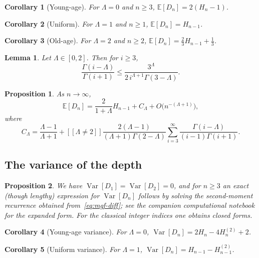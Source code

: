 \documentclass[11pt]{article}
\newtheorem{proposition}{Proposition}
\newtheorem{corollary}{Corollary}
\newtheorem{lemma}{Lemma}
\theoremstyle{remark}
\newcommand{\E}{\mathbb{E}}
\newcommand{\Var}{\operatorname{Var}}
\newcommand{\iverson}[1]{[\![#1]\!]}
\begin{document}
\begin{corollary}[Young-age]
For \(\Lambda=0\) and \(n\ge 3\), \(\E[D_n]=2(H_n-1)\).
\end{corollary}

\begin{corollary}[Uniform]
For \(\Lambda=1\) and \(n\ge 1\), \(\E[D_n]=H_{n-1}\).
\end{corollary}

\begin{corollary}[Old-age]
For \(\Lambda=2\) and \(n\ge 2\), \(\E[D_n]=\tfrac23 H_{n-1}+\tfrac13\).
\end{corollary}

\begin{lemma}
\label{lem:gamma-bound}
Let \(\Lambda\in[0,2]\). Then for \(i\ge 3\),
\[
\frac{\Gamma(i-\Lambda)}{\Gamma(i+1)}
\le\frac{3^\Lambda}{2\,i^{\Lambda+1}\Gamma(3-\Lambda)}.
\]
\end{lemma}

\begin{proposition}
\label{prop:asymp-mean}
As \(n\to\infty\),
\[
\E[D_n]=\frac{2}{1+\Lambda}H_{n-1}+C_\Lambda+O\bigl(n^{-(\Lambda+1)}\bigr),
\]
where
\[
C_\Lambda
=\frac{\Lambda-1}{\Lambda+1}
+\iverson{\Lambda\neq 2}
\frac{2(\Lambda-1)}{(\Lambda+1)\Gamma(2-\Lambda)}
\sum_{i=3}^\infty\frac{\Gamma(i-\Lambda)}{(i-1)\Gamma(i+1)}.
\]
\end{proposition}

\subsection{The variance of the depth}

\begin{proposition}
\label{prop:exact-var}
We have \(\Var[D_1]=\Var[D_2]=0\), and for \(n\ge 3\) an exact (though lengthy)
expression for \(\Var[D_n]\) follows by solving the second-moment recurrence
obtained from~\eqref{eq:mgf-diff}; see the companion computational notebook for
the expanded form. For the classical integer indices one obtains closed forms.
\end{proposition}

\begin{corollary}[Young-age variance]
For \(\Lambda=0\), \(\Var[D_n]=2H_n-4H_n^{(2)}+2\).
\end{corollary}

\begin{corollary}[Uniform variance]
For \(\Lambda=1\), \(\Var[D_n]=H_{n-1}-H_{n-1}^{(2)}\).
\end{corollary}
\end{document}
